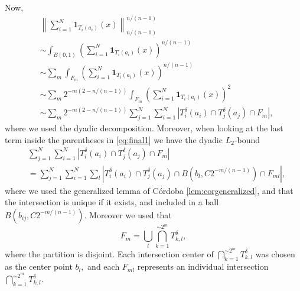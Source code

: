 \documentclass[11pt, letterpaper]{nyjm}
\begin{document}
	
	Now, 
	\begin{equation} \label{eq:final1}
		\begin{aligned}	
			&\left\| \sum_{i=1}^{N} \mathbf{1}_{T_i(a_i)}(x)
			\right\|_{n/(n-1)}^{n/(n-1)} \\
			&\sim \int_{B(0,1)}(\sum_{i=1}^{N} \mathbf{1}_{T_i(a_i)}(x))^{n/(n-1)} \\
			&\sim \sum_m \int_{F_m}(\sum_{i=1}^{N} \mathbf{1}_{T_i(a_i)}(x))^{n/(n-1)} \\
			&\sim \sum_m 2^{-m(2-n/(n-1))}\int_{F_m}(\sum_{i=1}^{N} \mathbf{1}_{T_i(a_i)}(x))^{2} \\
			&\sim \sum_m 2^{-m(2-n/(n-1))}\sum_{j=1}^{N}\sum_{i=1}^{N}|T^\delta_i(a_i) \cap T^\delta_j(a_j) \cap F_m|, 
		\end{aligned}
	\end{equation} 
	where we used the dyadic decomposition.
	Moreover, when looking at the last term inside the parentheses in \eqref{eq:final1} we have the dyadic $L_2$-bound 
	\begin{equation} \label{eq:final2}
		\begin{aligned}	
			&\sum_{j=1}^{N}\sum_{i=1}^{N}|T^\delta_i(a_i) \cap T^\delta_j(a_j) \cap F_m| \\
			& = \sum_{j=1}^{N}\sum_{i=1}^{N} \sum_{l}|T^\delta_i(a_i) \cap T^\delta_j(a_j)\cap B(b_{l},C2^{-m/(n-1)}) \cap F_{ml}|
			,
		\end{aligned}
	\end{equation}
	where we used the generalized lemma of C{\'o}rdoba \ref{lem:corgeneralized}, and that the intersection is unique if it exists, and included in a ball $B(b_{ij},C2^{-m/(n-1)}).$ Moreover we used that   
	\[
	F_m = \bigcup_l\bigcap_{k=1}^{\sim 2^m} T_{k,l}^{\delta}, 
	\]
	where the partition is disjoint.
	Each intersection center of  $\bigcap_{k=1}^{\sim 2^m} T_{k,l}^{\delta}$ was chosen as the center point $b_{l},$ and each $F_{ml}$ represents an individual intersection $\bigcap_{k=1}^{\sim 2^m} T_{k,l}^{\delta}.$ 
	
\end{document}
